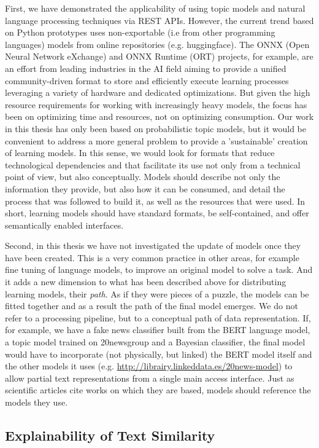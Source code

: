 First, we have demonstrated the applicability of using topic models and natural language processing techniques via REST APIs. However, the current trend based on Python prototypes uses non-exportable (i.e from other programming languages) models from online repositories (e.g. huggingface). The ONNX (Open Neural Network eXchange) and ONNX Runtime (ORT) projects, for example, are an effort from leading industries in the AI field aiming to provide a unified community-driven format to store and efficiently execute learning processes leveraging a variety of hardware and dedicated optimizations. But given the high resource requirements for working with increasingly heavy models, the focus has been on optimizing time and resources, not on optimizing consumption. Our work in this thesis has only been based on probabilistic topic models, but it would be convenient to address a more general problem to provide a 'sustainable' creation of learning models. In this sense, we would look for formats that reduce technological dependencies and that facilitate its use not only from a technical point of view, but also conceptually. Models should describe not only the information they provide, but also how it can be consumed, and detail the process that was followed to build it, as well as the resources that were used. In short, learning models should have standard formats, be self-contained, and offer semantically enabled interfaces.

Second, in this thesis we have not investigated the update of models once they have been created. This is a very common practice in other areas, for example fine tuning of language models, to improve an original model to solve a task. And it adds a new dimension to what has been described above for distributing learning models, their \textit{path}. As if they were pieces of a puzzle, the models can be fitted together and as a result the path of the final model emerges. We do not refer to a processing pipeline, but to a conceptual path of data representation. If, for example, we have a fake news classifier built from the BERT language model, a topic model trained on 20newsgroup and a Bayesian classifier, the final model would have to incorporate (not physically, but linked) the BERT model itself and the other models it uses (e.g. \url{http://librairy.linkeddata.es/20news-model}) to allow partial text representations from a single main access interface. Just as scientific articles cite works on which they are based, models should reference the models they use. 


\subsection{Explainability of Text Similarity}

